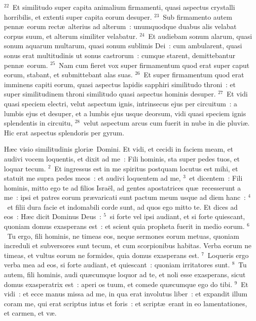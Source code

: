 ${}^{22}$~Et similitudo super capita animalium firmamenti, quasi aspectus crystalli horribilis, et extenti super capita eorum desuper.
${}^{23}$~Sub firmamento autem penn\ae\ eorum rect\ae\ alterius ad alterum~: unumquodque duabus alis velabat corpus suum, et alterum similiter velabatur.
${}^{24}$~Et audiebam sonum alarum, quasi sonum aquarum multarum, quasi sonum sublimis Dei~: cum ambularent, quasi sonus erat multitudinis ut sonus castrorum~: cumque starent, demittebantur penn\ae\ eorum.
${}^{25}$~Nam cum fieret vox super firmamentum quod erat super caput eorum, stabant, et submittebant alas suas.
${}^{26}$~Et super firmamentum quod erat imminens capiti eorum, quasi aspectus lapidis sapphiri similitudo throni~: et super similitudinem throni similitudo quasi aspectus hominis desuper.
${}^{27}$~Et vidi quasi speciem electri, velut aspectum ignis, intrinsecus ejus per circuitum~: a lumbis ejus et desuper, et a lumbis ejus usque deorsum, vidi quasi speciem ignis splendentis in circuitu,
${}^{28}$~velut aspectum arcus cum fuerit in nube in die pluvi\ae . Hic erat aspectus splendoris per gyrum.

\bchapter
\lettrine[lines=3,image=true,loversize=0.05,lraise=-0.03]{H}{}\ae c visio similitudinis glori\ae\ Domini. Et vidi, et cecidi in faciem meam, et audivi vocem loquentis, et dixit ad me~: Fili hominis, sta super pedes tuos, et loquar tecum.
${}^{2}$~Et ingressus est in me spiritus postquam locutus est mihi, et statuit me supra pedes meos~: et audivi loquentem ad me,
${}^{3}$~et dicentem~: Fili hominis, mitto ego te ad filios Isra\"el, ad gentes apostatrices qu\ae\ recesserunt a me~: ipsi et patres eorum pr\ae varicati sunt pactum meum usque ad diem hanc~:
${}^{4}$~et filii dura facie et indomabili corde sunt, ad quos ego mitto te. Et dices ad eos~: H\ae c dicit Dominus Deus~:
${}^{5}$~si forte vel ipsi audiant, et si forte quiescant, quoniam domus exasperans est~: et scient quia propheta fuerit in medio eorum.
${}^{6}$~Tu ergo, fili hominis, ne timeas eos, neque sermones eorum metuas, quoniam increduli et subversores sunt tecum, et cum scorpionibus habitas. Verba eorum ne timeas, et vultus eorum ne formides, quia domus exasperans est.
${}^{7}$~Loqueris ergo verba mea ad eos, si forte audiant, et quiescant~: quoniam irritatores sunt.
${}^{8}$~Tu autem, fili hominis, audi qu\ae cumque loquor ad te, et noli esse exasperans, sicut domus exasperatrix est~: aperi os tuum, et comede qu\ae cumque ego do tibi.
${}^{9}$~Et vidi~: et ecce manus missa ad me, in qua erat involutus liber~: et expandit illum coram me, qui erat scriptus intus et foris~: et script\ae\ erant in eo lamentationes, et carmen, et v\ae .

